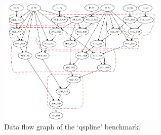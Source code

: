 \begin{figure}[tb]
	\centering
	\includegraphics[width=8cm]{figures/Cluster_qspline.pdf}
	\caption{Data flow graph of the `qspline' benchmark.}
	\label{qspline}
\end{figure}



